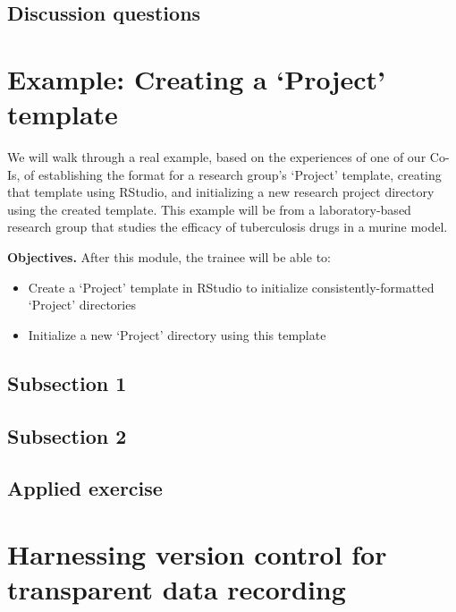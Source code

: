 \documentclass[]{tufte-book}
\providecommand{\tightlist}{%
  \setlength{\itemsep}{0pt}\setlength{\parskip}{0pt}}
\begin{document}
\hypertarget{discussion-questions-2}{%
\subsection{Discussion questions}\label{discussion-questions-2}}

\hypertarget{example-creating-a-project-template}{%
\section{Example: Creating a `Project' template}\label{example-creating-a-project-template}}

We will walk through a real example, based on the experiences of one of our
Co-Is, of establishing the format for a research group's `Project' template,
creating that template using RStudio, and initializing a new research project
directory using the created template. This example will be from a
laboratory-based research group that studies the efficacy of tuberculosis drugs
in a murine model.

\textbf{Objectives.} After this module, the trainee will be able to:

\begin{itemize}
\tightlist
\item
  Create a `Project' template in RStudio to initialize consistently-formatted
  `Project' directories
\item
  Initialize a new `Project' directory using this template
\end{itemize}

\hypertarget{subsection-1-3}{%
\subsection{Subsection 1}\label{subsection-1-3}}

\hypertarget{subsection-2-2}{%
\subsection{Subsection 2}\label{subsection-2-2}}

\hypertarget{applied-exercise-2}{%
\subsection{Applied exercise}\label{applied-exercise-2}}

\hypertarget{harnessing-version-control-for-transparent-data-recording}{%
\section{Harnessing version control for transparent data recording}\label{harnessing-version-control-for-transparent-data-recording}}
\end{document}
